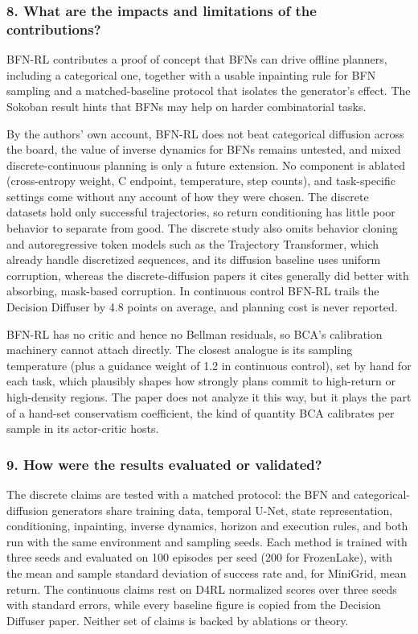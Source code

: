 \documentclass[11pt]{article}
\newcommand{\question}[1]{\subsubsection*{#1}}
\begin{document}
\question{8. What are the impacts and limitations of the contributions?}

BFN-RL contributes a proof of concept that BFNs can drive offline planners, including a categorical one, together with a usable inpainting rule for BFN sampling and a matched-baseline protocol that isolates the generator's effect. The Sokoban result hints that BFNs may help on harder combinatorial tasks.

By the authors' own account, BFN-RL does not beat categorical diffusion across the board, the value of inverse dynamics for BFNs remains untested, and mixed discrete-continuous planning is only a future extension. No component is ablated (cross-entropy weight, C endpoint, temperature, step counts), and task-specific settings come without any account of how they were chosen. The discrete datasets hold only successful trajectories, so return conditioning has little poor behavior to separate from good. The discrete study also omits behavior cloning and autoregressive token models such as the Trajectory Transformer, which already handle discretized sequences, and its diffusion baseline uses uniform corruption, whereas the discrete-diffusion papers it cites generally did better with absorbing, mask-based corruption. In continuous control BFN-RL trails the Decision Diffuser by 4.8 points on average, and planning cost is never reported.

BFN-RL has no critic and hence no Bellman residuals, so BCA's calibration machinery cannot attach directly. The closest analogue is its sampling temperature (plus a guidance weight of 1.2 in continuous control), set by hand for each task, which plausibly shapes how strongly plans commit to high-return or high-density regions. The paper does not analyze it this way, but it plays the part of a hand-set conservatism coefficient, the kind of quantity BCA calibrates per sample in its actor-critic hosts.

\question{9. How were the results evaluated or validated?}

The discrete claims are tested with a matched protocol: the BFN and categorical-diffusion generators share training data, temporal U-Net, state representation, conditioning, inpainting, inverse dynamics, horizon and execution rules, and both run with the same environment and sampling seeds. Each method is trained with three seeds and evaluated on 100 episodes per seed (200 for FrozenLake), with the mean and sample standard deviation of success rate and, for MiniGrid, mean return. The continuous claims rest on D4RL normalized scores over three seeds with standard errors, while every baseline figure is copied from the Decision Diffuser paper. Neither set of claims is backed by ablations or theory.
\end{document}
